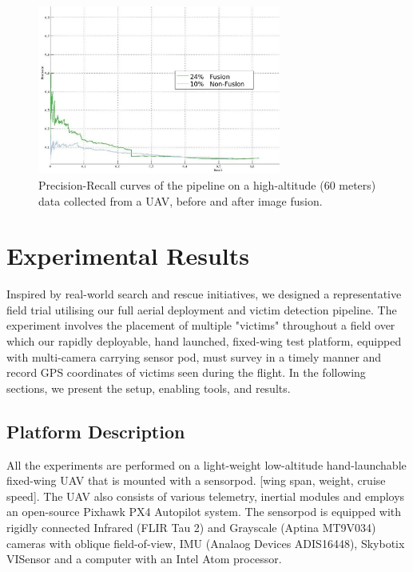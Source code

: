 \documentclass[runningheads]{llncs}
\begin{document}
\begin{figure}
  \centering
  	\includegraphics[width=8cm]{img/fusion/Roth/PR-roth-all-detections.jpg} 

  \caption{Precision-Recall curves of the pipeline on a high-altitude (60 meters) data collected from a UAV, before and after image fusion.}\label{fig:fusion}
\end{figure}


\section{Experimental Results}

Inspired by real-world search and rescue initiatives, we designed a representative field trial utilising our full aerial deployment and victim detection pipeline. The experiment involves the placement of multiple "victims" throughout a field over which our rapidly deployable, hand launched, fixed-wing test platform, equipped with multi-camera carrying sensor pod, must survey in a timely manner and record GPS coordinates of victims seen during the flight. In the following sections, we present the setup, enabling tools, and results.

\subsection{Platform Description}

All the experiments are performed on a light-weight low-altitude hand-launchable fixed-wing UAV that is mounted with a sensorpod. [wing span, weight, cruise speed]. The UAV also consists of various telemetry, inertial modules and employs an open-source Pixhawk PX4 Autopilot \cite{meier2015px4} system. The sensorpod is equipped with rigidly connected Infrared (FLIR Tau 2) and Grayscale (Aptina MT9V034) cameras with oblique field-of-view, IMU (Analaog Devices ADIS16448), Skybotix VISensor \cite{Skybotix} and a computer with an Intel Atom processor.
\end{document}
